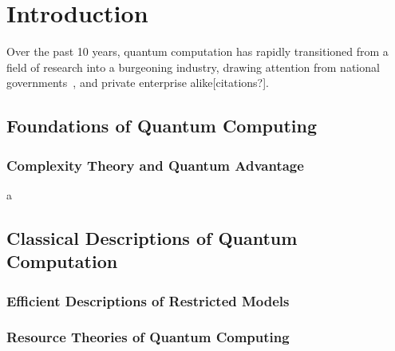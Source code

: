 
\chapter{Introduction}\label{chap:introduction}
Over the past 10 years, quantum computation has rapidly transitioned from a field of research into a burgeoning industry, drawing attention from national governments~\cite{UKNQTP,QuantumFlagship}, and private enterprise alike[citations?]. 
\section{Foundations of Quantum Computing}

\subsection{Complexity Theory and Quantum Advantage}a

\section{Classical Descriptions of Quantum Computation}

\subsection{Efficient Descriptions of Restricted Models}

\subsection{Resource Theories of Quantum Computing}

